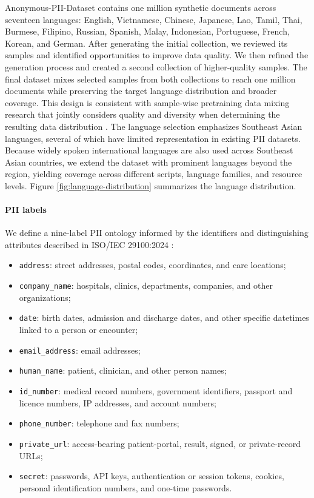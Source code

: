 \documentclass[11pt]{article}
\begin{document}
Anonymous-PII-Dataset contains one million synthetic documents across seventeen languages: English, Vietnamese, Chinese, Japanese, Lao, Tamil, Thai, Burmese, Filipino, Russian, Spanish, Malay, Indonesian, Portuguese, French, Korean, and German. After generating the initial collection, we reviewed its samples and identified opportunities to improve data quality. We then refined the generation process and created a second collection of higher-quality samples. The final dataset mixes selected samples from both collections to reach one million documents while preserving the target language distribution and broader coverage. This design is consistent with sample-wise pretraining data mixing research that jointly considers quality and diversity when determining the resulting data distribution \cite{xi-etal-2025-samplemix}. The language selection emphasizes Southeast Asian languages, several of which have limited representation in existing PII datasets. Because widely spoken international languages are also used across Southeast Asian countries, we extend the dataset with prominent languages beyond the region, yielding coverage across different scripts, language families, and resource levels. Figure \ref{fig:language-distribution} summarizes the language distribution.

\paragraph{PII labels}

We define a nine-label PII ontology informed by the identifiers and distinguishing attributes described in ISO/IEC 29100:2024 \cite{iso29100-2024}:
\begin{itemize}
    \item \texttt{address}: street addresses, postal codes, coordinates, and care locations;
    \item \texttt{company\_name}: hospitals, clinics, departments, companies, and other organizations;
    \item \texttt{date}: birth dates, admission and discharge dates, and other specific datetimes linked to a person or encounter;
    \item \texttt{email\_address}: email addresses;
    \item \texttt{human\_name}: patient, clinician, and other person names;
    \item \texttt{id\_number}: medical record numbers, government identifiers, passport and licence numbers, IP addresses, and account numbers;
    \item \texttt{phone\_number}: telephone and fax numbers;
    \item \texttt{private\_url}: access-bearing patient-portal, result, signed, or private-record URLs;
    \item \texttt{secret}: passwords, API keys, authentication or session tokens, cookies, personal identification numbers, and one-time passwords.
\end{itemize}
\end{document}

